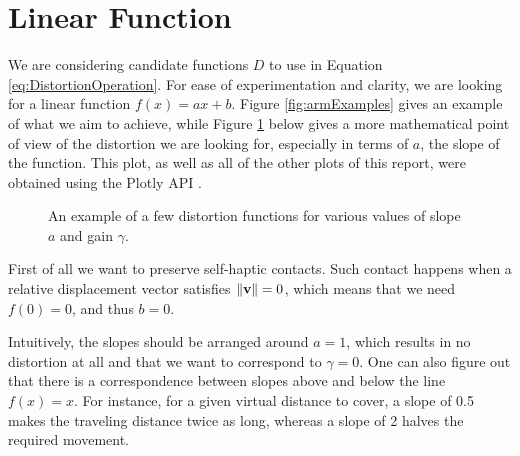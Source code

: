 \section{Linear Function}
\label{sec:linearFunction}
We are considering candidate functions $D$ to use in Equation \ref{eq:DistortionOperation}. For ease of experimentation and clarity, we are looking for a linear function $f(x) = ax + b$. Figure \ref{fig:armExamples} gives an example of what we aim to achieve, while Figure \ref{fig:plotsOfGamma} below gives a more mathematical point of view of the distortion we are looking for, especially in terms of $a$, the slope of the function. This plot, as well as all of the other plots of this report, were obtained using the Plotly API \cite{plotly}.

\begin{figure}[h]
    \caption{An example of a few distortion functions for various values of slope $a$ and gain $\gamma $.}\label{fig:plotsOfGamma}
\end{figure}

First of all we want to preserve self-haptic contacts. Such contact happens when a relative displacement vector satisfies $\lVert\mathbf{v}\rVert = 0$, which means that we need $f(0) = 0$, and thus $b = 0$.

Intuitively, the slopes should be arranged around $a=1$, which results in no distortion at all and that we want to correspond to $\gamma = 0$. One can also figure out that there is a correspondence between slopes above and below the line $f(x) = x$. For instance, for a given virtual distance to cover, a slope of \num{0.5} makes the traveling distance twice as long, whereas a slope of \num{2} halves the required movement.

